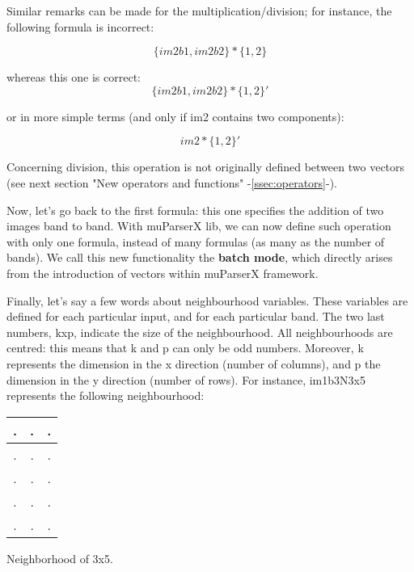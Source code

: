 Similar remarks can be made for the multiplication/division; 
for instance, the following formula is incorrect:

\begin{equation}
  \{im2b1,im2b2\} * \{1,2\}
\end{equation}

whereas this one is correct:
\begin{equation}
  \{im2b1,im2b2\} * \{1,2\}'
\end{equation}

or in more simple terms (and only if im2 contains two components): 

\begin{equation}
  im2* \{1,2\}'
\end{equation}

Concerning division, this operation is not originally defined between 
two vectors (see next section "New operators and functions" -\ref{ssec:operators}-).

\begin{center}
\end{center}

Now, let's go back to the first formula: this one specifies the addition 
of two images band to band. With muParserX lib, we can now define such 
operation with only one formula, instead of many formulas (as many as 
the number of bands). We call this new functionality the \textbf{batch mode}, 
which directly arises from the introduction of vectors within muParserX framework.

Finally, let's say a few words about neighbourhood variables. 
These variables are defined for each particular input, and for each 
particular band. The two last numbers, kxp, indicate the size of the 
neighbourhood. All neighbourhoods are centred: this means that k and p 
can only be odd numbers. Moreover, k represents the dimension in the 
x direction (number of columns), and p the dimension in the y direction 
(number of rows). For instance, im1b3N3x5 represents the following 
neighbourhood: 

\begin{center} 
\begin{tabular}{|c|c|c|}
\hline
.	& .	& . \\
\hline
.	& .	& . \\
\hline
.	& .	& . \\
\hline
.	& .	& . \\
\hline
.	& .	& . \\
\hline
\end{tabular}
\end{center}
\caption{Neighborhood of 3x5.}
\label{correctness}

